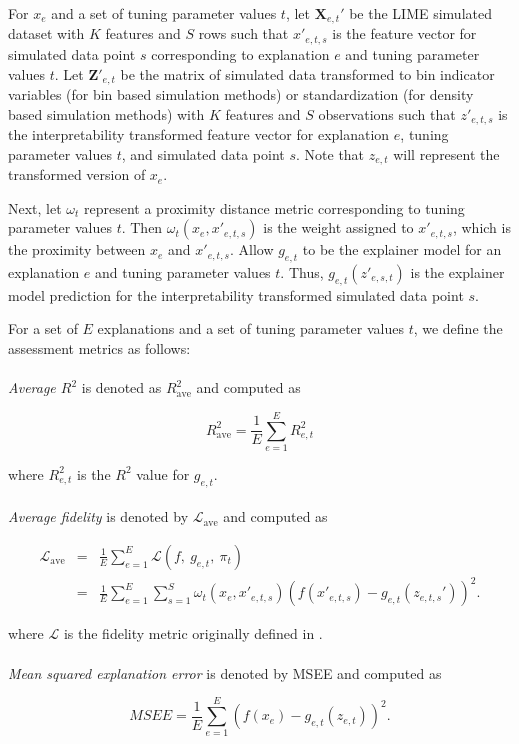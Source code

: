 \documentclass[AMS,STIX2COL]{WileyNJD-v2}\usepackage[]{graphicx}\usepackage[]{color}
\begin{document}
For $x_e$ and a set of tuning parameter values $t$, let $\textbf{X}_{e,t}'$ be the LIME simulated dataset with $K$ features and $S$ rows such that $x'_{e,t,s}$ is the feature vector for simulated data point $s$ corresponding to explanation $e$ and tuning parameter values $t$. Let $\textbf{Z}'_{e,t}$ be the matrix of simulated data transformed to bin indicator variables (for bin based simulation methods) or standardization (for density based simulation methods) with $K$ features and $S$ observations such that $z'_{e,t,s}$ is the interpretability transformed feature vector for explanation $e$, tuning parameter values $t$, and simulated data point $s$. Note that $z_{e,t}$ will represent the transformed version of $x_e$.

Next, let $\omega_t$ represent a proximity distance metric corresponding to tuning parameter values $t$. Then $\omega_t\left(x_e, x'_{e,t,s}\right)$ is the weight assigned to $x'_{e,t,s}$, which is the proximity between $x_e$ and $x'_{e,t,s}$. Allow $g_{e,t}$ to be the explainer model for an explanation $e$ and tuning parameter values $t$. Thus, $g_{e,t}\left(z'_{e,s,t}\right)$ is the explainer model prediction for the interpretability transformed simulated data point $s$.

For a set of $E$ explanations and a set of tuning parameter values $t$, we define the assessment metrics as follows:\\
\\
\emph{Average $R^2$} is denoted as $R^2_{\mbox{ave}}$ and computed as

  $$R^2_{\mbox{ave}} = \frac{1}{E}\sum_{e=1}^E R_{e,t}^2$$

\noindent where $R_{e,t}^2$ is the $R^2$ value for $g_{e,t}$.\\
\\
\emph{Average fidelity} is denoted by $\mathcal{L}_{\mbox{ave}}$ and computed as

\begin{eqnarray*} \mathcal{L}_{\mbox{ave}} & = & \frac{1}{E}\sum_{e=1}^E\mathcal{L}(f, \ g_{e,t}, \ \pi_{t}) \\ & = & \frac{1}{E}\sum_{e=1}^E\sum_{s=1}^{S}\omega_{t}\left(x_e, x'_{e,t,s}\right)\left(f\left(x'_{e,t,s}\right)-g_{e,t}\left(z_{e,t,s}'\right)\right)^2. \end{eqnarray*}

\noindent where $\mathcal{L}$ is the fidelity metric originally defined in \citet{ribeiro:2016}.\\
\\
\emph{Mean squared explanation error} is denoted by MSEE and computed as

$$MSEE=\frac{1}{E}\sum_{e=1}^E\left(f\left(x_e\right)-g_{e,t}\left(z_{e,t}\right)\right)^2.$$
\end{document}
